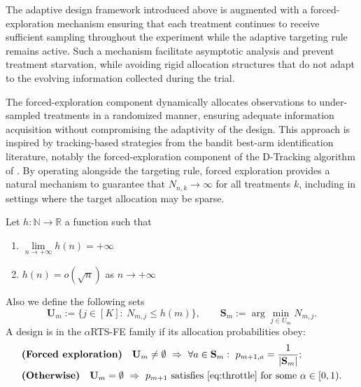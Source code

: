 
The adaptive design framework introduced above is augmented with a forced-exploration mechanism ensuring that each treatment continues to receive sufficient sampling throughout the experiment while the adaptive targeting rule remains active. Such a mechanism facilitate asymptotic analysis and prevent treatment starvation, while avoiding rigid allocation structures that do not adapt to the evolving information collected during the trial.

The forced-exploration component dynamically allocates observations to under-sampled
treatments in a randomized manner, ensuring adequate information acquisition without
compromising the adaptivity of the design. This approach is inspired by tracking-based
strategies from the bandit best-arm identification literature, notably the forced-exploration
component of the D-Tracking algorithm of \cite{garivier2016optimal}. By operating
alongside the targeting rule, forced exploration provides a natural mechanism to
guarantee that $N_{n,k}\to\infty$ for all treatments $k$, including in settings where
the target allocation may be sparse.
 
\begin{definition}\label{def:rts-fe-def}
	Let $h:\mathbb{N}\to\mathbb{R}$ a function such that
	\begin{enumerate}[label=(\roman*)]
		\item $\lim\limits_{n \to +\infty} h(n) = +\infty$
		\item $h(n)=o(\sqrt{n})$ as \(n \to +\infty\)
	\end{enumerate}
	
	
%	

	
	Also we define the following sets
	\begin{equation}
		\mathbf{U}_m:=\{j\in[K]:\ N_{m,j}\le h(m)\},\qquad \mathbf{S}_m:=\arg\min_{j\in U_m} N_{m,j}.
	\end{equation}
	A design is in the \(\alpha\)RTS-FE family if its allocation probabilities obey:
	\begin{align}
		&\textbf{(Forced exploration)}\quad \mathbf{U}_m\neq\emptyset\ \Rightarrow\ \forall a\in \mathbf{S}_m:\ p_{m+1,a}=\frac{1}{|\mathbf{S}_m|};\label{eq:fe-phase}\\
		&\textbf{(Otherwise)}\quad \mathbf{U}_m=\emptyset\ \Rightarrow\ \text{$p_{m+1}$ satisfies \eqref{eq:throttle} for some $\alpha\in[0,1)$}.\label{eq:fe-otherwise}
	\end{align}
\end{definition}


